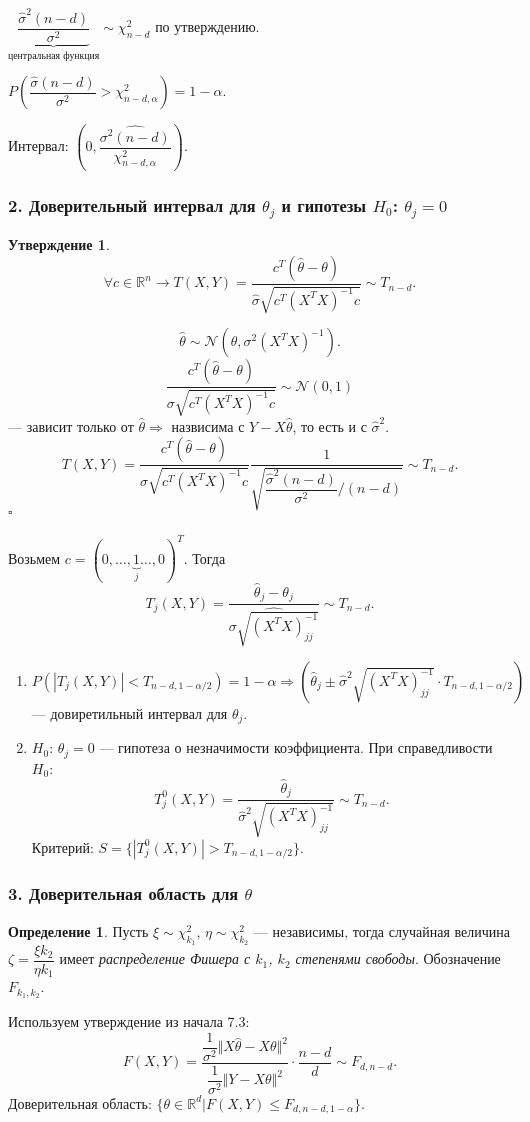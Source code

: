 \documentclass[12pt]{report}
\renewenvironment{proof}{{\bfseries Доказательство:}}{$\square$\\\\}
\newtheorem{proposition}{Утверждение}
\theoremstyle{definition}
\newtheorem{definition}{Определение}
\begin{document}
$\underbrace{\dfrac{\hat{\sigma}^2(n-d)}{\sigma^2}}_{\text{центральная функция}} \sim \chi^2_{n-d}$ по утверждению.

$P\left(\dfrac{\hat{\sigma} (n-d)}{\sigma^2} > \chi^2_{n-d, \alpha}\right) = 1 - \alpha$.

Интервал: $\left(0, \dfrac{\hat{\sigma^2(n-d)}}{\chi^2_{n-d, \alpha}}\right)$.

\subsubsection{2. Доверительный интервал для $\theta_j$ и гипотезы $H_0$: $\theta_j = 0$}
\begin{proposition}
	$$\forall c \in \mathbb{R}^n \rightarrow T(X, Y) = \dfrac{c^T(\hat{\theta} - \theta)}{\hat{\sigma}\sqrt{c^T(X^T X)^{-1}c}} \sim T_{n-d}.$$
\end{proposition}
\begin{proof}
	$$\hat{\theta} \sim \mathcal{N}(\theta, \sigma^2(X^T X)^{-1}).$$
	$$\dfrac{c^T(\hat{\theta} - \theta)}{\sigma\sqrt{c^T (X^T X)^{-1}c}} \sim \mathcal{N}(0, 1)$$
	— зависит только от $\hat{\theta} \Rightarrow$ назвисима с $Y - X\hat{\theta}$, то есть и с $\hat{\sigma}^2$.
	$$T(X, Y) = \dfrac{c^T(\hat{\theta} - \theta)}{\sigma\sqrt{c^T(X^T X)^{-1}c}} \dfrac{1}{\sqrt{\dfrac{\hat{\sigma}^2(n-d)}{\sigma^2}/(n-d)}}\sim T_{n-d}.$$
\end{proof}
Возьмем $c = (0, \ldots, \underbrace{1}_{j} \ldots, 0)^T$. Тогда
$$T_j(X, Y) = \dfrac{\hat{\theta}_j - \theta_j}{\hat{\sigma\sqrt{(X^T X)^{-1}_{jj}}}} \sim T_{n-d}.$$
\begin{enumerate}
	\item $P(|T_j(X, Y)| < T_{n-d, 1-\alpha/2}) = 1 - \alpha \Rightarrow (\hat{\theta}_j \pm \hat{\sigma}^2\sqrt{(X^T X)^{-1}_{jj}}\cdot T_{n-d,1-\alpha/2})$ — довиретильный интервал для $\theta_j$.
	\item $H_0$: $\theta_j = 0$ — гипотеза о незначимости коэффициента. При справедливости $H_0$:
	$$T_j^0(X, Y) = \dfrac{\hat{\theta}_j}{\hat{\sigma}^2\sqrt{(X^T X)^{-1}_{jj}}} \sim T_{n-d}.$$
	Критерий: $S =\{|T_j^0(X, Y)| > T_{n-d,1-\alpha/2}\}$.
\end{enumerate}

\subsubsection{3. Доверительная область для $\theta$}
\begin{definition}
	Пусть $\xi \sim \chi^2_{k_1}$, $\eta \sim \chi^2_{k_2}$ — независимы, тогда случайная величина $\zeta = \dfrac{\xi k_2}{\eta k_1}$ имеет \emph{распределение Фишера с $k_1$, $k_2$ степенями свободы}. Обозначение $F_{k_1, k_2}$.
\end{definition}
Используем утверждение из начала 7.3:
$$F(X, Y) = \dfrac{\dfrac{1}{\sigma^2}\Vert X\hat{\theta} - X\theta\Vert^2}{\dfrac{1}{\sigma^2}\Vert Y - X\theta\Vert^2} \cdot \dfrac{n-d}{d} \sim F_{d, n-d}.$$
Доверительная область: $\{\theta \in \mathbb{R}^d | F(X, Y) \leqslant F_{d, n-d, 1-\alpha}\}$.
\end{document}
